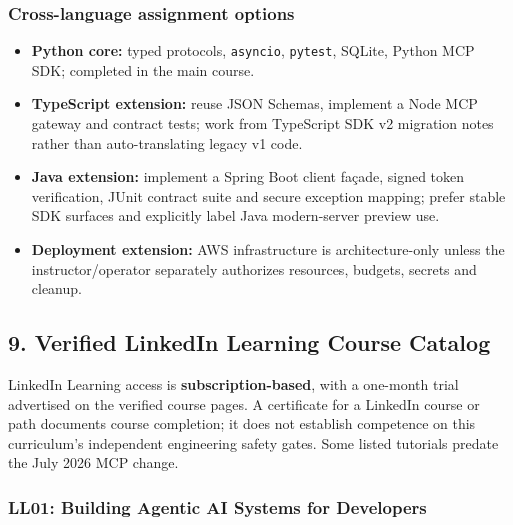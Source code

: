 \documentclass[
  10pt,
]{article}
\providecommand{\tightlist}{%
  \setlength{\itemsep}{0pt}\setlength{\parskip}{0pt}}
\begin{document}
\subsubsection{Cross-language assignment
options}\label{cross-language-assignment-options}

\begin{itemize}
\tightlist
\item
  \textbf{Python core:} typed protocols, \texttt{asyncio},
  \texttt{pytest}, SQLite, Python MCP SDK; completed in the main course.
\item
  \textbf{TypeScript extension:} reuse JSON Schemas, implement a Node
  MCP gateway and contract tests; work from TypeScript SDK v2 migration
  notes rather than auto-translating legacy v1 code.
\item
  \textbf{Java extension:} implement a Spring Boot client façade, signed
  token verification, JUnit contract suite and secure exception mapping;
  prefer stable SDK surfaces and explicitly label Java modern-server
  preview use.
\item
  \textbf{Deployment extension:} AWS infrastructure is architecture-only
  unless the instructor/operator separately authorizes resources,
  budgets, secrets and cleanup.
\end{itemize}

\subsection{9. Verified LinkedIn Learning Course
Catalog}\label{verified-linkedin-learning-course-catalog}

LinkedIn Learning access is \textbf{subscription-based}, with a
one-month trial advertised on the verified course pages. A certificate
for a LinkedIn course or path documents course completion; it does not
establish competence on this curriculum's independent engineering safety
gates. Some listed tutorials predate the July 2026 MCP change.

\subsubsection{LL01: Building Agentic AI Systems for
Developers}\label{ll01-building-agentic-ai-systems-for-developers}
\end{document}
